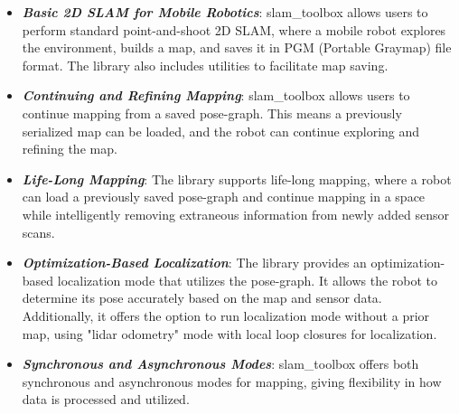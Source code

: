 \begin{itemize}
    \item \textit{\textbf{Basic 2D SLAM for Mobile Robotics}}: slam\_toolbox allows users to perform standard point-and-shoot 2D SLAM, where a mobile robot explores the environment, builds a map, and saves it in PGM (Portable Graymap) file format. The library also includes utilities to facilitate map saving.
    
    \item \textit{\textbf{Continuing and Refining Mapping}}: slam\_toolbox allows users to continue mapping from a saved pose-graph. This means a previously serialized map can be loaded, and the robot can continue exploring and refining the map.
    
    \item \textit{\textbf{Life-Long Mapping}}: The library supports life-long mapping, where a robot can load a previously saved pose-graph and continue mapping in a space while intelligently removing extraneous information from newly added sensor scans.
    
    \item \textit{\textbf{Optimization-Based Localization}}: The library provides an optimization-based localization mode that utilizes the pose-graph. It allows the robot to determine its pose accurately based on the map and sensor data. Additionally, it offers the option to run localization mode without a prior map, using "lidar odometry" mode with local loop closures for localization.
    
    \item \textit{\textbf{Synchronous and Asynchronous Modes}}: slam\_toolbox offers both synchronous and asynchronous modes for mapping, giving flexibility in how data is processed and utilized.
\end{itemize}

